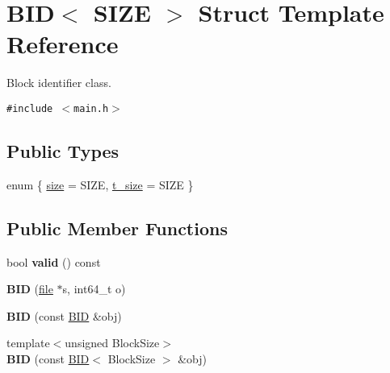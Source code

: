 \hypertarget{structBID}{
\section{BID$<$ SIZE $>$ Struct Template Reference}
\label{structBID}
}
Block identifier class.  


{\tt \#include $<$main.h$>$}

\subsection*{Public Types}
\begin{CompactItemize}
\item 
enum \{ \hyperlink{structBID_c0031771196a42b2015dff3c779daf7149b29a3349c693e4d54ccd538fa65fbb}{size} =  SIZE, 
\hyperlink{group__mnglayer_gc0031771196a42b2015dff3c779daf713ab3777c88d3151437be65ed9116a034}{t\_\-size} =  SIZE
 \}
\end{CompactItemize}
\subsection*{Public Member Functions}
\begin{CompactItemize}
\item 
\hypertarget{group__mnglayer_gdbb5760c51c6719d6b6ab13d2b3c38dd}{
bool \textbf{valid} () const }
\label{group__mnglayer_gdbb5760c51c6719d6b6ab13d2b3c38dd}

\item 
\hypertarget{group__mnglayer_gb0dde5f54bfe601660d1b116098d2ed3}{
\textbf{BID} (\hyperlink{classfile}{file} $\ast$s, int64\_\-t o)}
\label{group__mnglayer_gb0dde5f54bfe601660d1b116098d2ed3}

\item 
\hypertarget{group__mnglayer_g2ae908ccd9bca9712449a3d45b95ec7b}{
\textbf{BID} (const \hyperlink{structBID}{BID} \&obj)}
\label{group__mnglayer_g2ae908ccd9bca9712449a3d45b95ec7b}

\item 
\hypertarget{group__mnglayer_gf485b70a6f5e3ff226342ca5c621b2f9}{
{\footnotesize template$<$unsigned BlockSize$>$ }\\\textbf{BID} (const \hyperlink{structBID}{BID}$<$ BlockSize $>$ \&obj)}
\label{group__mnglayer_gf485b70a6f5e3ff226342ca5c621b2f9}

\end{CompactItemize}
